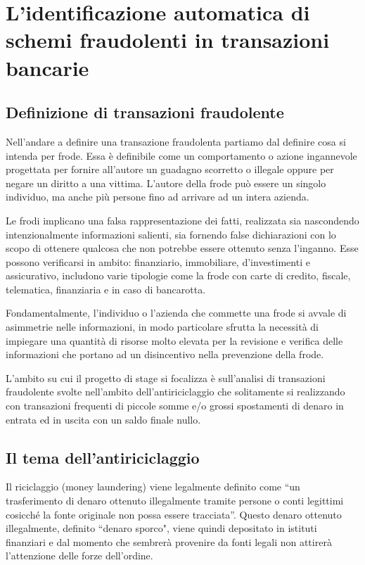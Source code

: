 
\chapter{L'identificazione automatica di schemi fraudolenti in transazioni bancarie}

\section{Definizione di transazioni fraudolente}

Nell'andare a definire una transazione fraudolenta partiamo dal definire cosa si intenda per frode. 
Essa è definibile come un comportamento o azione ingannevole progettata per fornire all'autore un guadagno scorretto o illegale oppure per negare un diritto a una vittima. 
L’autore della frode può essere un singolo individuo, ma anche più persone fino ad arrivare ad un intera azienda.

Le frodi implicano una falsa rappresentazione dei fatti, realizzata sia nascondendo intenzionalmente informazioni salienti, sia fornendo false dichiarazioni con lo scopo di ottenere qualcosa che non potrebbe essere ottenuto senza l’inganno. 
Esse possono verificarsi in ambito: finanziario, immobiliare, d’investimenti e assicurativo, includono varie tipologie come la frode con carte di credito, fiscale, telematica, finanziaria e in caso di bancarotta.

Fondamentalmente, l’individuo o l’azienda che commette una frode si avvale di asimmetrie nelle informazioni, in modo particolare sfrutta la necessità di impiegare una quantità di risorse molto elevata per la revisione e verifica delle informazioni che portano ad un disincentivo nella prevenzione della frode.

L'ambito su cui il progetto di stage si focalizza è sull'analisi di transazioni fraudolente svolte nell'ambito dell'antiriciclaggio che solitamente si realizzando con transazioni frequenti di piccole somme e/o grossi spostamenti di denaro in entrata ed in uscita con un saldo finale nullo.



\section{Il tema dell'antiriciclaggio}

Il riciclaggio (money laundering) viene legalmente definito come “un trasferimento di denaro ottenuto illegalmente tramite persone o conti legittimi cosicché la fonte originale non possa essere tracciata”\citep{teher}.
Questo denaro ottenuto illegalmente, definito ``denaro sporco",  viene quindi depositato in istituti finanziari e dal momento che sembrerà provenire da fonti legali non attirerà l’attenzione delle forze dell'ordine.

